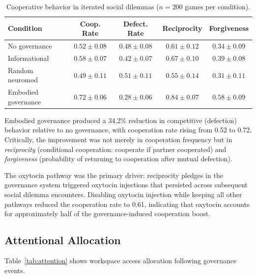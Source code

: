 \documentclass[11pt,a4paper]{article}
\begin{document}
\begin{table}[h]
\centering
\caption{Cooperative behavior in iterated social dilemmas ($n = 200$ games per condition).}
\label{tab:cooperation}
\begin{tabular}{lcccc}
\toprule
\textbf{Condition} & \textbf{Coop. Rate} & \textbf{Defect. Rate} & \textbf{Reciprocity} & \textbf{Forgiveness} \\
\midrule
No governance       & $0.52 \pm 0.08$ & $0.48 \pm 0.08$ & $0.61 \pm 0.12$ & $0.34 \pm 0.09$ \\
Informational       & $0.58 \pm 0.07$ & $0.42 \pm 0.07$ & $0.67 \pm 0.10$ & $0.39 \pm 0.08$ \\
Random neuromod     & $0.49 \pm 0.11$ & $0.51 \pm 0.11$ & $0.55 \pm 0.14$ & $0.31 \pm 0.11$ \\
Embodied governance & $0.72 \pm 0.06$ & $0.28 \pm 0.06$ & $0.84 \pm 0.07$ & $0.58 \pm 0.09$ \\
\bottomrule
\end{tabular}
\end{table}

Embodied governance produced a 34.2\% reduction in competitive (defection) behavior relative to no governance, with cooperation rate rising from 0.52 to 0.72.
Critically, the improvement was not merely in cooperation frequency but in \emph{reciprocity} (conditional cooperation: cooperate if partner cooperated) and \emph{forgiveness} (probability of returning to cooperation after mutual defection).

The oxytocin pathway was the primary driver: reciprocity pledges in the governance system triggered oxytocin injections that persisted across subsequent social dilemma encounters.
Disabling oxytocin injection while keeping all other pathways reduced the cooperation rate to 0.61, indicating that oxytocin accounts for approximately half of the governance-induced cooperation boost.

\subsection{Attentional Allocation}

Table~\ref{tab:attention} shows workspace access allocation following governance events.
\end{document}
